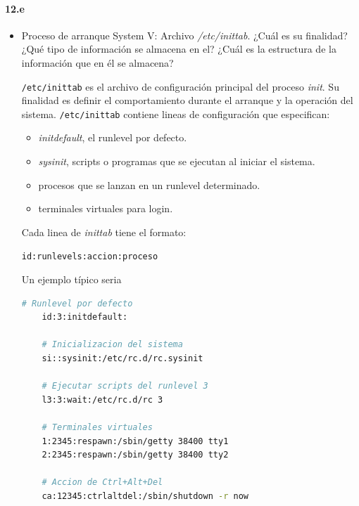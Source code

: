 \documentclass[10pt,a4paper]{paper}
\begin{document}
\paragraph{12.e}
\begin{itemize}
	
	\item {Proceso de arranque System V:} Archivo \textit{/etc/inittab}. ¿Cuál es su finalidad? ¿Qué tipo de información se almacena en el? ¿Cuál es la estructura de la información que en él se almacena?
	
	\texttt{/etc/inittab} es el archivo de configuración principal del proceso \textit{init}. Su finalidad es definir el comportamiento durante el arranque y la operación del sistema. \texttt{/etc/inittab} contiene lineas de configuración que especifican: 
	
	\begin{itemize}
		\item \textit{initdefault}, el runlevel por defecto.
		
		\item \textit{sysinit}, scripts o programas que se ejecutan al iniciar el sistema.
		
		\item procesos que se lanzan en un runlevel determinado.
		
		\item terminales virtuales para login.
		
		
	\end{itemize}
	
	
	Cada linea de \textit{inittab} tiene el formato:
	
	\texttt{id:runlevels:accion:proceso}
	
	Un ejemplo típico seria
	
	\begin{lstlisting}[language=bash]
	# Runlevel por defecto
	id:3:initdefault:
	
	# Inicializacion del sistema
	si::sysinit:/etc/rc.d/rc.sysinit
	
	# Ejecutar scripts del runlevel 3
	l3:3:wait:/etc/rc.d/rc 3
	
	# Terminales virtuales
	1:2345:respawn:/sbin/getty 38400 tty1
	2:2345:respawn:/sbin/getty 38400 tty2
	
	# Accion de Ctrl+Alt+Del
	ca:12345:ctrlaltdel:/sbin/shutdown -r now
	\end{lstlisting}
	
	
\end{itemize}
\end{document}
